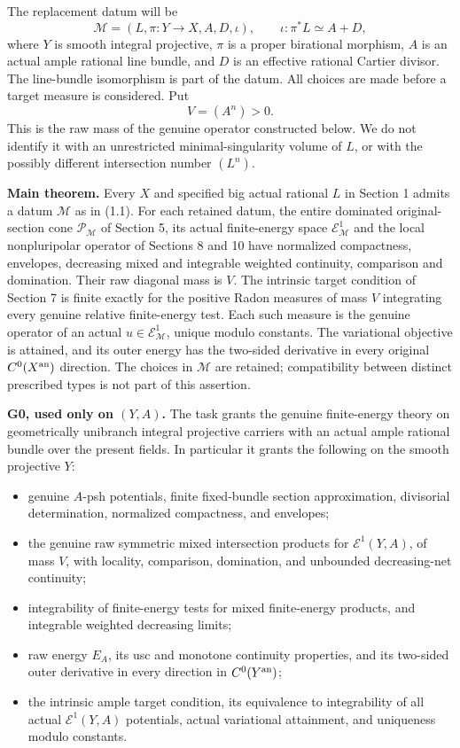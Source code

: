 \documentclass[
  10pt,
]{article}
\providecommand{\tightlist}{%
  \setlength{\itemsep}{0pt}\setlength{\parskip}{0pt}}
\begin{document}
The replacement datum will be \[
\mathcal M=(L,\pi:Y\longrightarrow X,A,D,\iota),\qquad
\iota:\pi^*L\simeq A+D,                                      \tag{1.1}
\] where \(Y\) is smooth integral projective, \(\pi\) is a proper
birational morphism, \(A\) is an actual ample rational line bundle, and
\(D\) is an effective rational Cartier divisor. The line-bundle
isomorphism is part of the datum. All choices are made before a target
measure is considered. Put \[V=(A^n)>0.\] This is the raw mass of the
genuine operator constructed below. We do not identify it with an
unrestricted minimal-singularity volume of \(L\), or with the possibly
different intersection number \((L^n)\).

\textbf{Main theorem.} Every \(X\) and specified big actual rational
\(L\) in Section 1 admits a datum \(\mathcal M\) as in (1.1). For each
retained datum, the entire dominated original-section cone
\(\mathcal P_{\mathcal M}\) of Section 5, its actual finite-energy space
\(\mathcal E^1_{\mathcal M}\) and the local nonpluripolar operator of
Sections 8 and 10 have normalized compactness, envelopes, decreasing
mixed and integrable weighted continuity, comparison and domination.
Their raw diagonal mass is \(V\). The intrinsic target condition of
Section 7 is finite exactly for the positive Radon measures of mass
\(V\) integrating every genuine relative finite-energy test. Each such
measure is the genuine operator of an actual
\(u\in\mathcal E^1_{\mathcal M}\), unique modulo constants. The
variational objective is attained, and its outer energy has the
two-sided derivative in every original \(C^0(X^{\rm an})\) direction.
The choices in \(\mathcal M\) are retained; compatibility between
distinct prescribed types is not part of this assertion.

\textbf{G0, used only on \((Y,A)\).} The task grants the genuine
finite-energy theory on geometrically unibranch integral projective
carriers with an actual ample rational bundle over the present fields.
In particular it grants the following on the smooth projective \(Y\):

\begin{itemize}
\tightlist
\item
  genuine \(A\)-psh potentials, finite fixed-bundle section
  approximation, divisorial determination, normalized compactness, and
  envelopes;
\item
  the genuine raw symmetric mixed intersection products for
  \(\mathcal E^1(Y,A)\), of mass \(V\), with locality, comparison,
  domination, and unbounded decreasing-net continuity;
\item
  integrability of finite-energy tests for mixed finite-energy products,
  and integrable weighted decreasing limits;
\item
  raw energy \(E_A\), its usc and monotone continuity properties, and
  its two-sided outer derivative in every direction in
  \(C^0(Y^{\rm an})\);
\item
  the intrinsic ample target condition, its equivalence to integrability
  of all actual \(\mathcal E^1(Y,A)\) potentials, actual variational
  attainment, and uniqueness modulo constants.
\end{itemize}
\end{document}
